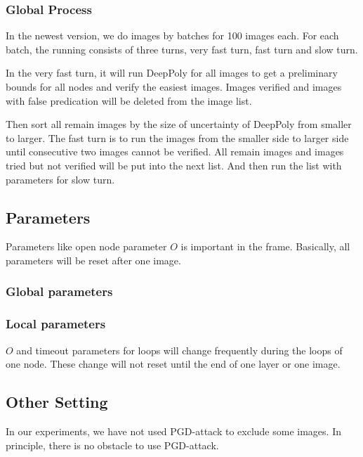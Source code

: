 \subsubsection*{Global Process}

In the newest version, we do images by batches for 100 images each. For each batch, the running consists of three turns, very fast turn, fast turn and slow turn.

In the very fast turn, it will run DeepPoly for all images to get a preliminary bounds for all nodes and verify the easiest images. Images verified and images with false predication will be deleted from the image list.

Then sort all remain images by the size of uncertainty of DeepPoly from smaller to larger. The fast turn is to run the images from the smaller side to larger side until consecutive two images cannot be verified. All remain images and images tried but not verified will be put into the next list. And then run the list with parameters for slow turn.




\subsection{Parameters}

Parameters like open node parameter $O$ is important in the frame. Basically, all parameters will be reset after one image.

\subsubsection*{Global parameters}




\subsubsection*{Local parameters}

$O$ and timeout parameters for loops will change frequently during the loops of one node. These change will not reset until the end of one layer or one image.



\subsection{Other Setting}

In our experiments, we have not used PGD-attack to exclude some images. In principle, there is no obstacle to use PGD-attack.
\fi




